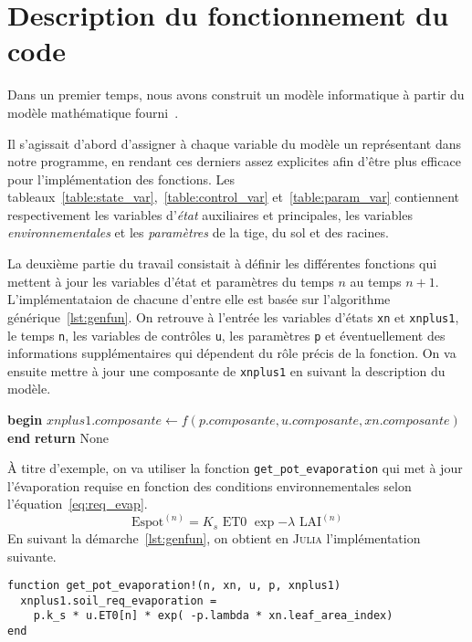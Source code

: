 \section{Description du fonctionnement du code}
Dans un premier temps, nous avons construit un modèle informatique à partir
du modèle mathématique fourni~\cite{lnas_model_wheat}.

Il s'agissait d'abord d'assigner à chaque variable du modèle un représentant
dans notre programme, en rendant ces derniers assez explicites
afin d'être plus efficace pour l'implémentation des fonctions.
Les tableaux~\ref{table:state_var},~\ref{table:control_var} et~\ref{table:param_var}
contiennent respectivement les variables d'\emph{état} auxiliaires et principales, 
les variables \emph{environnementales} et les \emph{paramètres} de la tige, du sol et des racines.

La deuxième partie du travail consistait à définir les différentes fonctions
qui mettent à jour les variables d'état et paramètres du 
temps $n$ au temps $n+1$.
L'implémentataion de chacune d'entre elle est basée sur l'algorithme générique~\ref{lst:genfun}.
On retrouve à l'entrée les variables d'états \texttt{xn} et \texttt{xnplus1},
le temps \texttt{n}, les variables de contrôles \texttt{u}, les paramètres \texttt{p}
et éventuellement des informations supplémentaires qui dépendent
du rôle précis de la fonction.
On va ensuite mettre à jour une composante de \lstinline|xnplus1| en suivant la description du modèle.

\begin{algorithm}[t]
  \caption{Algorithme générique qui sert de base pour l'implémentation
des fonctions. La fonction $f$ n'est pas définie mais sert de placeholder
pour représenter les opérations nécessaires à la mise à jour de \lstinline|xnplus1|.}
\label{lst:genfun}
  \begin{algorithmic}[1]
    \State \textbf{begin}
      \State $xnplus1.composante \gets f(p.composante, u.composante, xn.composante)$
    \State \textbf{end}
    \State \textbf{return} None
    \EndProcedure
  \end{algorithmic}
\end{algorithm}


À titre d'exemple, on va utiliser la fonction \lstinline|get_pot_evaporation| qui met
à jour l'évaporation requise en fonction des conditions environnementales
selon l'équation~\ref{eq:req_evap}.
\begin{equation}
  \text{Espot}^{(n)} = K_s \text{ ET0 } \exp{-\lambda \text{ LAI}^{(n)}}
  \label{eq:req_evap}
\end{equation}
En suivant la démarche~\ref{lst:genfun}, on obtient en \textsc{Julia}
l'implémentation suivante.
\begin{lstlisting}
function get_pot_evaporation!(n, xn, u, p, xnplus1)
  xnplus1.soil_req_evaporation = 
    p.k_s * u.ET0[n] * exp( -p.lambda * xn.leaf_area_index) 
end
\end{lstlisting}



